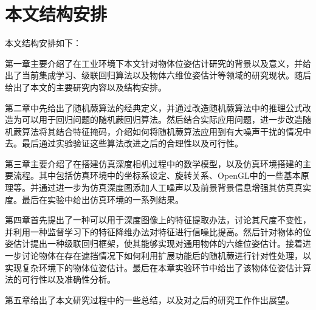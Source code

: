 \section{本文结构安排}

本文结构安排如下：

第一章主要介绍了在工业环境下本文针对物体位姿估计研究的背景以及意义，并给出了当前集成学习、级联回归算法以及物体六维位姿估计等领域的研究现状。随后给出了本文的主要研究内容以及结构安排。

第二章中先给出了随机蕨算法的经典定义，并通过改造随机蕨算法中的推理公式改造为可以用于回归问题的随机蕨回归算法。然后结合实际应用问题，进一步改造随机蕨算法将其结合特征掩码，介绍如何将随机蕨算法应用到有大噪声干扰的情况中去。最后通过实验验证这些算法改进之后的合理性以及可行性。

第三章主要介绍了在搭建仿真深度相机过程中的数学模型，以及仿真环境搭建的主要流程。其中包括仿真环境中的坐标系设定、旋转关系、OpenGL中的一些基本原理等。并通过进一步为仿真深度图添加人工噪声以及前景背景信息增强其仿真真实度。最后在实验中给出仿真环境的一系列结果。

第四章首先提出了一种可以用于深度图像上的特征提取办法，讨论其尺度不变性，并利用一种监督学习下的特征降维办法对特征进行信噪比提高。然后针对物体的位姿估计提出一种级联回归框架，使其能够实现对通用物体的六维位姿估计。接着进一步讨论物体在存在遮挡情况下如何利用扩展功能后的随机蕨进行针对性处理，以实现复杂环境下的物体位姿估计。最后在本章实验环节中给出了该物体位姿估计算法的可行性以及准确性分析。

第五章给出了本文研究过程中的一些总结，以及对之后的研究工作作出展望。














